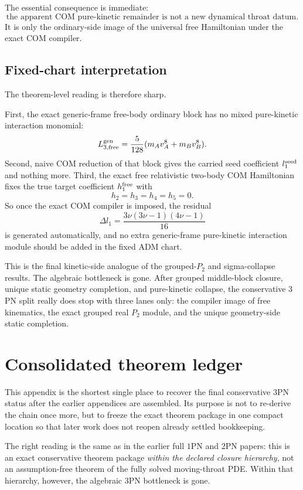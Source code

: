 \documentclass[11pt]{article}
\begin{document}
The essential consequence is immediate:
\[
\boxed{
\text{the apparent COM pure-kinetic remainder is not a new dynamical throat datum.}
}
\]
It is only the ordinary-side image of the universal free Hamiltonian under the exact COM compiler.

\subsection{Fixed-chart interpretation}
\label{app:pure_kinetic_collapse_derivation:fixed_chart_interpretation}

The theorem-level reading is therefore sharp.

First, the exact generic-frame free-body ordinary block has no mixed pure-kinetic interaction monomial:
\[
L_{3,\rm free}^{\rm gen}=\frac{5}{128}(m_Av_A^8+m_Bv_B^8).
\]
Second, naive COM reduction of that block gives the carried seed coefficient $l_1^{\rm seed}$ and nothing more. Third, the exact free relativistic two-body COM Hamiltonian fixes the true target coefficient $h_1^{\rm free}$ with
\[
 h_2=h_3=h_4=h_5=0.
\]
So once the exact COM compiler is imposed, the residual
\[
\Delta l_1=\frac{3\nu(3\nu-1)(4\nu-1)}{16}
\]
is generated automatically, and no extra generic-frame pure-kinetic interaction module should be added in the fixed ADM chart.

This is the final kinetic-side analogue of the grouped-$P_2$ and sigma-collapse results. The algebraic bottleneck is gone. After grouped middle-block closure, unique static geometry completion, and pure-kinetic collapse, the conservative $3$PN split really does stop with three lanes only: the compiler image of free kinematics, the exact grouped real $P_2$ module, and the unique geometry-side static completion.

\section{Consolidated theorem ledger}
\label{app:theorem-ledger}

This appendix is the shortest single place to recover the final conservative $3$PN status after the earlier appendices are assembled. Its purpose is not to re-derive the chain once more, but to freeze the exact theorem package in one compact location so that later work does not reopen already settled bookkeeping.

The right reading is the same as in the earlier full $1$PN and $2$PN papers: this is an exact conservative theorem package \emph{within the declared closure hierarchy}, not an assumption-free theorem of the fully solved moving-throat PDE. Within that hierarchy, however, the algebraic $3$PN bottleneck is gone.
\end{document}
